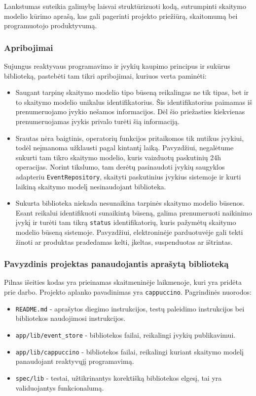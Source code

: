 Lankstumas suteikia galimybę laisvai struktūrizuoti kodą, sutrumpinti skaitymo modelio kūrimo aprašą, kas gali pagerinti projekto priežiūrą, skaitomumą bei programuotojo produktyvumą.

\subsubsection{Apribojimai}

Sujungus reaktyvaus programavimo ir įvykių kaupimo principus ir sukūrus biblioteką, pastebėti tam tikri apribojimai, kuriuos verta paminėti:

\begin{itemize}
  \item Saugant tarpinę skaitymo modelio tipo būseną reikalingas ne tik tipas, bet ir to skaitymo modelio unikalus identifikatorius. Šis identifikatorius paimamas iš prenumeruojamo įvykio nešamos informacijos. Dėl šio priežasties kiekvienas prenumeruojamas įvykis privalo turėti šią informaciją.
  \item Srautas nėra baigtinis, operatorių funkcijos pritaikomos tik nutikus įvykiui, todėl neįmanoma užklausti pagal kintantį laiką. Pavyzdžiui, negalėtume sukurti tam tikro skaitymo modelio, kuris vaizduotų paskutinių 24h operacijas. Norint tikslumo, tam derėtų pasinaudoti įvykių saugyklos adapteriu \lstinline|EventRepository|, skaityti paskutinius įvykius sistemoje ir kurti laikiną skaitymo modelį nesinaudojant biblioteka.
  \item Sukurta biblioteka niekada nesunaikina tarpinės skaitymo modelio būsenos. Esant reikalui identifikuoti sunaikintą būseną, galima prenumeruoti naikinimo įvykį ir turėti tam tikrą \lstinline|status| identifikatorių, kuris pažymėtų skaitymo modelio būseną sistemoje. Pavyzdžiui, elektroninėje parduotuvėje gali tekti žinoti ar produktas pradedamas kelti, įkeltas, suspenduotas ar ištrintas.
\end{itemize}

\subsubsection{Pavyzdinis projektas panaudojantis aprašytą biblioteką}

Pilnas išeities kodas yra prieinamas skaitmeninėje laikmenoje, kuri yra pridėta prie darbo. Projekto aplanko pavadinimas yra \lstinline|cappuccino|. Pagrindinės nuorodos:

\begin{itemize}
  \item \lstinline|README.md| - aprašytos diegimo instrukcijos, testų paleidimo instrukcijos bei bibliotekos naudojimosi instrukcijos.
  \item \lstinline|app/lib/event_store| - bibliotekos failai, reikalingi įvykių publikavimui.
  \item \lstinline|app/lib/cappuccino| - bibliotekos failai, reikalingi kuriant skaitymo modelį panaudojant reaktyvųjį programavimą.
  \item \lstinline|spec/lib| - testai, užtikrinantys korektišką bibliotekos elgesį, tai yra validuojantys funkcionalumą.
\end{itemize}
